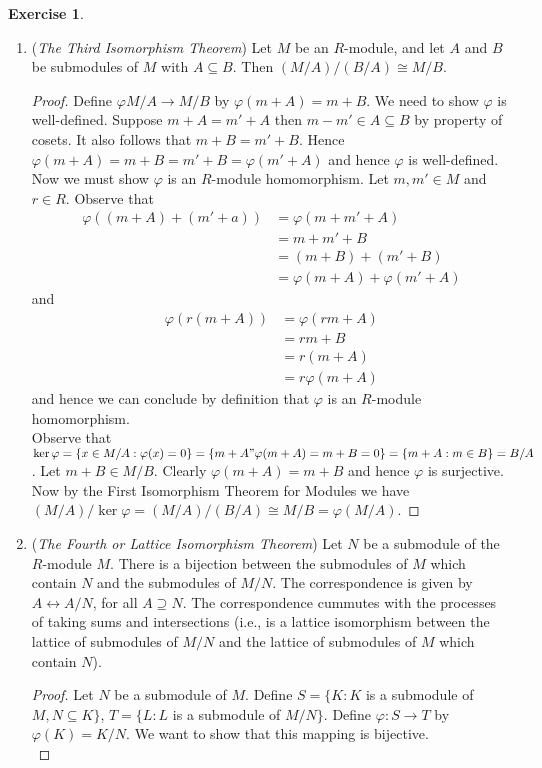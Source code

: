 \documentclass[8pt]{amsart}
\theoremstyle{plain}%
\theoremstyle{definition}
\newtheorem{exercise}{Exercise}[section]
\theoremstyle{remark}
\numberwithin{equation}{section}
\begin{document}
\begin{exercise}
\begin{enumerate}
\begin{proof}
			\end{proof}
		\item (\textit{The Third Isomorphism Theorem}) Let $M$ be an $R$-module, and let $A$ and $B$ be submodules of $M$ with $A \subseteq B$. Then $(M/A)/(B/A) \cong M/B$.
			\begin{proof}
				Define $\varphi M/A \to M/B$ by $\varphi(m + A) = m + B$. We need to show $\varphi$ is well-defined. Suppose $m + A = m' + A$ then $m - m' \in A \subseteq B$ by property of cosets. It also follows that $m + B = m' + B$. Hence $\varphi(m + A) = m + B = m' + B = \varphi(m' + A)$ and hence $\varphi$ is well-defined.\\

				Now we must show $\varphi$ is an $R$-module homomorphism. Let $m, m' \in M$ and $r \in R$. Observe that
				\begin{align*}
					\varphi((m + A) + (m' + a)) &= \varphi(m + m' + A)\\
					&= m + m' + B\\
					&= (m + B) + (m' + B)\\
					&= \varphi(m + A) + \varphi(m' + A)
				\end{align*}
				and
				\begin{align*}
					\varphi(r(m + A)) &= \varphi(rm + A)\\
					&= rm + B\\
					&= r(m + A)\\
					&= r\varphi(m + A)
				\end{align*}
				and hence we can conclude by definition that $\varphi$ is an $R$-module homomorphism.\\

				Observe that $\ker \varphi = \{x \in M/A : \varphi(x) = 0\} = \{m + A " \varphi(m + A) = m + B = 0\} = \{m + A : m \in B\} = B/A$. Let $m + B \in M/B$. Clearly $\varphi(m + A) = m + B$ and hence $\varphi$ is surjective. Now by the First Isomorphism Theorem for Modules we have $(M/A)/\ker \varphi = (M/A)/(B/A) \cong M/B = \varphi(M/A)$.
			\end{proof}
		\item (\textit{The Fourth or Lattice Isomorphism Theorem}) Let $N$ be a submodule of the $R$-module $M$. There is a bijection between the submodules of $M$ which contain $N$ and the submodules of $M/N$. The correspondence is given by $A \leftrightarrow A/N$, for all $A \supseteq N$. The correspondence cummutes with the processes of taking sums and intersections (i.e., is a lattice isomorphism between the lattice of submodules of $M/N$ and the lattice of submodules of $M$ which contain $N$).
			\begin{proof}
				Let $N$ be a submodule of $M$. Define $S = \{K : K$ is a submodule of $M, N \subseteq K\}$, $T = \{L : L$ is a submodule of $M/N\}$. Define $\varphi : S \to T$ by $\varphi(K) = K/N$. We want to show that this mapping is bijective.\\


\end{proof}
\end{enumerate}
\end{exercise}
\end{document}
